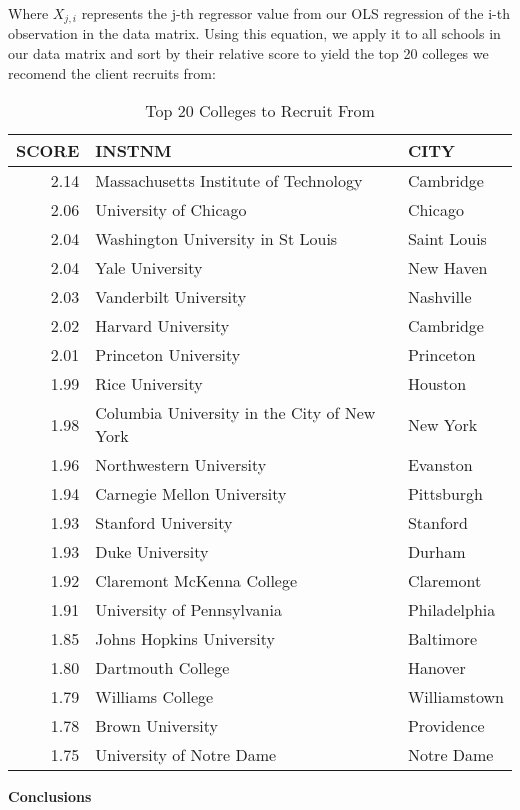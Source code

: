 \documentclass[11pt,english]{article}
\begin{document}
Where $X_{j,i}$ represents the j-th regressor value from our OLS regression of the i-th observation in the data matrix. Using this equation, we apply it to all schools in our data matrix and sort by their relative score to yield the top 20 colleges we recomend the client recruits from:
\begin{table}[ht]
\centering
\begin{tabular}{rll}
  \hline
SCORE & INSTNM & CITY \\ 
  \hline
2.14 & Massachusetts Institute of Technology & Cambridge \\ 
  2.06 & University of Chicago & Chicago \\ 
  2.04 & Washington University in St Louis & Saint Louis \\ 
  2.04 & Yale University & New Haven \\ 
  2.03 & Vanderbilt University & Nashville \\ 
  2.02 & Harvard University & Cambridge \\ 
  2.01 & Princeton University & Princeton \\ 
  1.99 & Rice University & Houston \\ 
  1.98 & Columbia University in the City of New York & New York \\ 
  1.96 & Northwestern University & Evanston \\ 
  1.94 & Carnegie Mellon University & Pittsburgh \\ 
  1.93 & Stanford University & Stanford \\ 
  1.93 & Duke University & Durham \\ 
  1.92 & Claremont McKenna College & Claremont \\ 
  1.91 & University of Pennsylvania & Philadelphia \\ 
  1.85 & Johns Hopkins University & Baltimore \\ 
  1.80 & Dartmouth College & Hanover \\ 
  1.79 & Williams College & Williamstown \\ 
  1.78 & Brown University & Providence \\ 
  1.75 & University of Notre Dame & Notre Dame \\ 
   \hline
\end{tabular}
\caption{Top 20 Colleges to Recruit From} 
\end{table}
\vspace*{3\baselineskip}


{\large\textbf{Conclusions}} \\\
\end{document}
